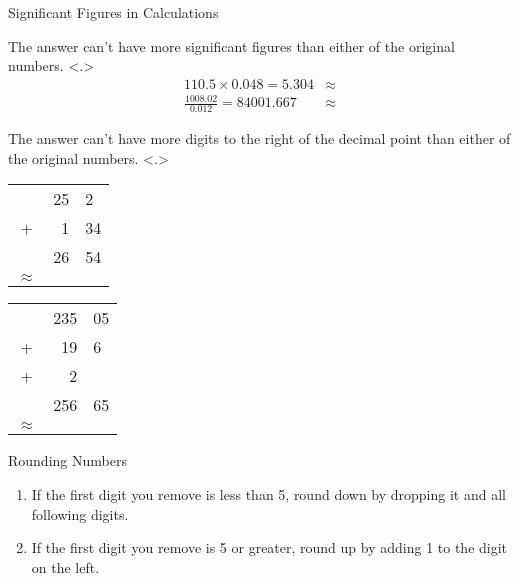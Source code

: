 \documentclass[notes=show]{beamer}
\begin{document}
\begin{frame}[t]{Significant Figures in Calculations}
	\begin{description}
		\item<+->[Multiplication or Division:] The answer can't have more
			\alert{significant figures} than either of the original numbers.
			\only<.>{
				\begin{align*}
					110.5 \times 0.048 = 5.304 &\approx \\
					\frac{1008.02}{0.012} = 84001.667
					&\approx
				\end{align*}}
		\item<+->[Addition or Subtraction:] The answer can't have more
		digits to the \alert{right} of the \alert{decimal point} than
			either of the original numbers.
			\only<.>{
				\begin{center}
				\begin{tabular} {c r@{.}l}
					& 25 & 2 \\
					+ & 1 & 34 \\ \midrule
					& 26 & 54 \\
					$\approx$
				\end{tabular}
					\qquad
				\begin{tabular} {c r@{.}l}
					& 235 & 05 \\
					+ & 19 & 6 \\
					+ & 2 \\ \midrule
					& 256 & 65 \\
					$\approx$
				\end{tabular}
				\end{center}}
	\end{description}

\end{frame}

\begin{frame}{Rounding Numbers}
	\begin{enumerate}
		\item<1-> If the first digit you remove is less than 5, round
			down by dropping it and all following digits.
		\item<2-> If the first digit you remove is 5 or greater, round
			up by adding 1 to the digit on the left.
	\end{enumerate}

\end{frame}
\end{document}
